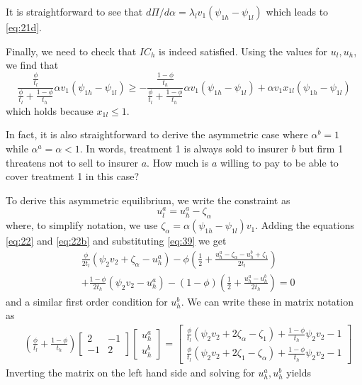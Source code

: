 \documentclass[a4paper,12pt]{article}
\begin{document}
It is straightforward to see that \(d\Pi/d\alpha = \lambda_{l} v_1 (\psi_{1h}-\psi_{1l})\) which leads to \eqref{eq:21d}.

Finally, we need to check that \(IC_h\) is indeed satisfied. Using the values for \(u_l,u_h\), we find that
\begin{equation}
\label{eq:24}
\frac{\frac{\phi}{t_l}}{\frac{\phi}{t_l}+\frac{1-\phi}{t_h}}\alpha v_1 (\psi_{1h}-\psi_{1l}) \geq -\frac{\frac{1-\phi}{t_h}}{\frac{\phi}{t_l}+\frac{1-\phi}{t_h}}\alpha v_1 (\psi_{1h}-\psi_{1l}) + \alpha v_1 x_{1l} (\psi_{1h}-\psi_{1l})
\end{equation}
which holds because \(x_{1l} \leq 1\).

In fact, it is also straightforward to derive the asymmetric case where \(\alpha^b =1\) while \(\alpha^a = \alpha <1\). In words, treatment 1 is always sold to insurer \(b\) but firm 1 threatens not to sell to insurer \(a\). How much is \(a\) willing to pay to be able to cover treatment 1 in this case?

To derive this asymmetric equilibrium, we write the constraint as
\begin{equation}
\label{eq:39}
u_l^a = u_h^a - \zeta_{\alpha}
\end{equation}
where, to simplify notation, we use \(\zeta_{\alpha}=\alpha (\psi_{1h}-\psi_{1l})v_1\).
Adding the equations \eqref{eq:22} and \eqref{eq:22b} and substituting \eqref{eq:39} we get
\begin{equation}
\label{eq:40}
\begin{split}
&\frac{\phi}{2t_l}(\psi_2 v_2 + \zeta_{\alpha} - u_h^a) - \phi(\frac{1}{2} + \frac{u_h^a - \zeta_{\alpha} - u_h^b + \zeta_1}{2t_l} ) \\
&+\frac{1-\phi}{2t_h} (\psi_2 v_2 - u_h^a) - (1-\phi) (\frac{1}{2} + \frac{u_h^a - u_h^b}{2t_h} )   =0
\end{split}
\end{equation}
and a similar first order condition for \(u_h^b\). We can write these in matrix notation as
\begin{equation}
\label{eq:41}
\begin{split}
& (\frac{\phi}{t_l} + \frac{1-\phi}{t_h})
\begin{bmatrix}
2 & -1 \\
-1&  2
\end{bmatrix}
\begin{bmatrix}
u_h^a \\
u_h^b
\end{bmatrix}
=
\begin{bmatrix}
\frac{\phi}{t_l}(\psi_2 v_2 + 2 \zeta_{\alpha} - \zeta_1) + \frac{1-\phi}{t_h}\psi_2 v_2 -1 \\
\frac{\phi}{t_l}(\psi_2 v_2 + 2 \zeta_{1} - \zeta_\alpha) + \frac{1-\phi}{t_h}\psi_2 v_2 -1
\end{bmatrix}
\end{split}
\end{equation}
Inverting the matrix on the left hand side and solving for \(u_h^a,u_h^b\) yields
\end{document}
